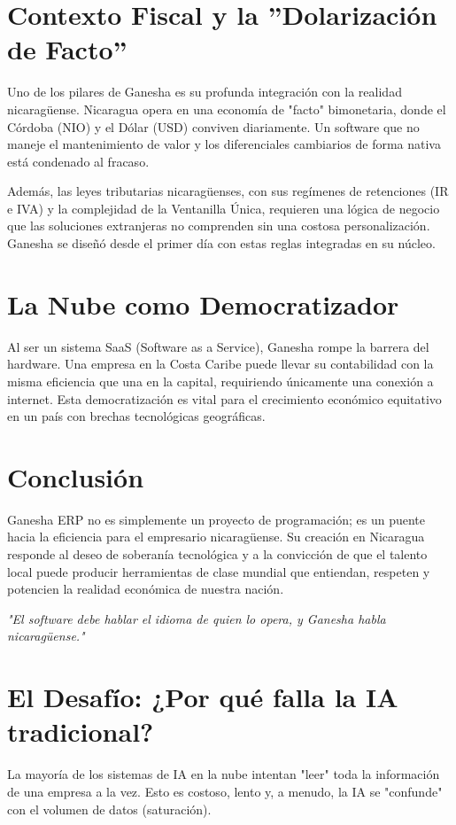 \documentclass[12pt, a4paper, oneside]{book}
\begin{document}
\chapter{Contexto Fiscal y la ''Dolarización de Facto''}
Uno de los pilares de Ganesha es su profunda integración con la realidad nicaragüense. Nicaragua opera en una economía de "facto" bimonetaria, donde el Córdoba (NIO) y el Dólar (USD) conviven diariamente. Un software que no maneje el mantenimiento de valor y los diferenciales cambiarios de forma nativa está condenado al fracaso. 

Además, las leyes tributarias nicaragüenses, con sus regímenes de retenciones (IR e IVA) y la complejidad de la Ventanilla Única, requieren una lógica de negocio que las soluciones extranjeras no comprenden sin una costosa personalización. Ganesha se diseñó desde el primer día con estas reglas integradas en su núcleo.

\chapter{La Nube como Democratizador}
Al ser un sistema SaaS (Software as a Service), Ganesha rompe la barrera del hardware. Una empresa en la Costa Caribe puede llevar su contabilidad con la misma eficiencia que una en la capital, requiriendo únicamente una conexión a internet. Esta democratización es vital para el crecimiento económico equitativo en un país con brechas tecnológicas geográficas.

\chapter{Conclusión}
Ganesha ERP no es simplemente un proyecto de programación; es un puente hacia la eficiencia para el empresario nicaragüense. Su creación en Nicaragua responde al deseo de soberanía tecnológica y a la convicción de que el talento local puede producir herramientas de clase mundial que entiendan, respeten y potencien la realidad económica de nuestra nación.

\vfill
\begin{center}
    \textit{"El software debe hablar el idioma de quien lo opera, y Ganesha habla nicaragüense."}
\end{center}

\chapter{El Desafío: ¿Por qué falla la IA tradicional?}
La mayoría de los sistemas de IA en la nube intentan "leer" toda la información de una empresa a la vez. Esto es costoso, lento y, a menudo, la IA se "confunde" con el volumen de datos (saturación).
\end{document}
